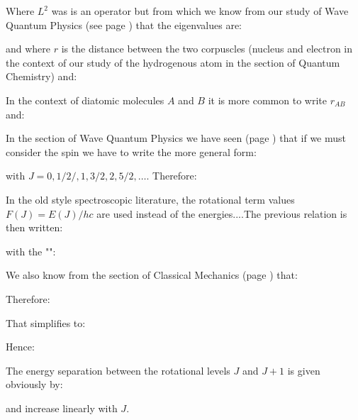 	Where $L^2$ was is an operator but from which we know from our study of Wave Quantum Physics (see page \pageref{eigenvalue of angular momentum}) that the eigenvalues are:
	
	and where $r$ is the distance between the two corpuscles (nucleus and electron in the context of our study of the hydrogenous atom in the section of Quantum Chemistry) and:
	
	In the context of diatomic molecules $A$ and $B$ it is more common to write $r_{AB}$ and:
	
	In the section of Wave Quantum Physics we have seen (page \pageref{angular momentum and spin}) that if we must consider the spin we have to write the more general form:
	
	with $J=0,1/2/,1,3/2,2,5/2,\ldots$. Therefore:
	
	In the old style spectroscopic literature, the rotational term values $F(J) = E(J)/hc$ are used instead of the energies....The previous relation is then written:
	
	with the "":
	
	We also know from the section of Classical Mechanics (page \pageref{moment of inertia}) that:
	
	Therefore:
	
	That simplifies to:
	
	Hence:
	
	
	The energy separation between the rotational levels $J$ and $J+1$ is given obviously by:
	
	and increase linearly with $J$.
	
